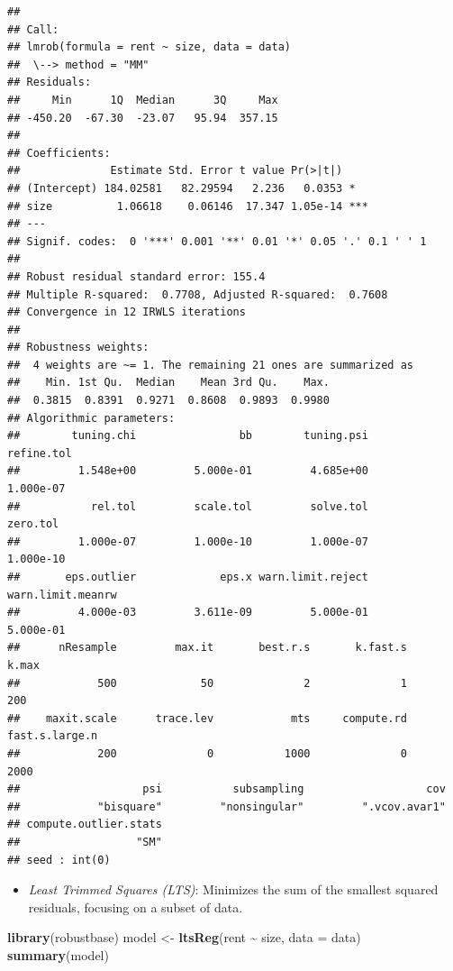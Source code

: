 \documentclass[
]{article}
\newenvironment{Shaded}{\begin{snugshade}}{\end{snugshade}}
\newcommand{\AttributeTok}[1]{\textcolor[rgb]{0.13,0.29,0.53}{#1}}
\newcommand{\FunctionTok}[1]{\textcolor[rgb]{0.13,0.29,0.53}{\textbf{#1}}}
\newcommand{\NormalTok}[1]{#1}
\newcommand{\OtherTok}[1]{\textcolor[rgb]{0.56,0.35,0.01}{#1}}
\newcommand{\SpecialCharTok}[1]{\textcolor[rgb]{0.81,0.36,0.00}{\textbf{#1}}}
\providecommand{\tightlist}{%
  \setlength{\itemsep}{0pt}\setlength{\parskip}{0pt}}
\begin{document}
\begin{verbatim}
## 
## Call:
## lmrob(formula = rent ~ size, data = data)
##  \--> method = "MM"
## Residuals:
##     Min      1Q  Median      3Q     Max 
## -450.20  -67.30  -23.07   95.94  357.15 
## 
## Coefficients:
##              Estimate Std. Error t value Pr(>|t|)    
## (Intercept) 184.02581   82.29594   2.236   0.0353 *  
## size          1.06618    0.06146  17.347 1.05e-14 ***
## ---
## Signif. codes:  0 '***' 0.001 '**' 0.01 '*' 0.05 '.' 0.1 ' ' 1
## 
## Robust residual standard error: 155.4 
## Multiple R-squared:  0.7708, Adjusted R-squared:  0.7608 
## Convergence in 12 IRWLS iterations
## 
## Robustness weights: 
##  4 weights are ~= 1. The remaining 21 ones are summarized as
##    Min. 1st Qu.  Median    Mean 3rd Qu.    Max. 
##  0.3815  0.8391  0.9271  0.8608  0.9893  0.9980 
## Algorithmic parameters: 
##        tuning.chi                bb        tuning.psi        refine.tol 
##         1.548e+00         5.000e-01         4.685e+00         1.000e-07 
##           rel.tol         scale.tol         solve.tol          zero.tol 
##         1.000e-07         1.000e-10         1.000e-07         1.000e-10 
##       eps.outlier             eps.x warn.limit.reject warn.limit.meanrw 
##         4.000e-03         3.611e-09         5.000e-01         5.000e-01 
##      nResample         max.it       best.r.s       k.fast.s          k.max 
##            500             50              2              1            200 
##    maxit.scale      trace.lev            mts     compute.rd fast.s.large.n 
##            200              0           1000              0           2000 
##                   psi           subsampling                   cov 
##            "bisquare"         "nonsingular"         ".vcov.avar1" 
## compute.outlier.stats 
##                  "SM" 
## seed : int(0)
\end{verbatim}

\begin{itemize}
\tightlist
\item
  \emph{Least Trimmed Squares (LTS)}: Minimizes the sum of the smallest
  squared residuals, focusing on a subset of data.
\end{itemize}

\begin{Shaded}
\begin{Highlighting}[]
\FunctionTok{library}\NormalTok{(robustbase)}
\NormalTok{model }\OtherTok{\textless{}{-}} \FunctionTok{ltsReg}\NormalTok{(rent }\SpecialCharTok{\textasciitilde{}}\NormalTok{ size, }\AttributeTok{data =}\NormalTok{ data)}
\FunctionTok{summary}\NormalTok{(model)}
\end{Highlighting}
\end{Shaded}
\end{document}
